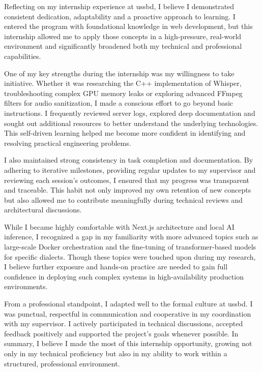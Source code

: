 \documentclass[oneside]{thesis-library}
\begin{document}
Reflecting on my internship experience at \Gls{ussbd}, I believe I demonstrated consistent dedication, adaptability and a proactive approach to learning. I entered the program with foundational knowledge in web development, but this internship allowed me to apply those concepts in a high-pressure, real-world environment and significantly broadened both my technical and professional capabilities.

One of my key strengths during the internship was my willingness to take initiative. Whether it was researching the C++ implementation of Whisper, troubleshooting complex GPU memory leaks or exploring advanced FFmpeg filters for audio sanitization, I made a conscious effort to go beyond basic instructions. I frequently reviewed server logs, explored deep documentation and sought out additional resources to better understand the underlying technologies. This self-driven learning helped me become more confident in identifying and resolving practical engineering problems.

I also maintained strong consistency in task completion and documentation. By adhering to iterative milestones, providing regular updates to my supervisor and reviewing each session's outcomes, I ensured that my progress was transparent and traceable. This habit not only improved my own retention of new concepts but also allowed me to contribute meaningfully during technical reviews and architectural discussions.

While I became highly comfortable with Next.js architecture and local AI inference, I recognized a gap in my familiarity with more advanced topics such as large-scale Docker orchestration and the fine-tuning of transformer-based models for specific dialects. Though these topics were touched upon during my research, I believe further exposure and hands-on practice are needed to gain full confidence in deploying such complex systems in high-availability production environments.

From a professional standpoint, I adapted well to the formal culture at \Gls{ussbd}. I was punctual, respectful in communication and cooperative in my coordination with my supervisor. I actively participated in technical discussions, accepted feedback positively and supported the project’s goals whenever possible. In summary, I believe I made the most of this internship opportunity, growing not only in my technical proficiency but also in my ability to work within a structured, professional environment.
\end{document}
